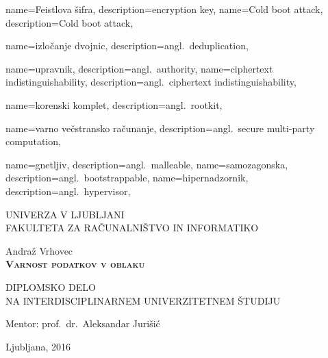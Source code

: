 \documentclass[12pt,a4paper,openany,tikz]{book}
\theoremstyle{plain}
\theoremstyle{definition}
\begin{document}
{
  name=Feistlova šifra,
  description={encryption key},
}
{
  name=Cold boot attack,
  description={Cold boot attack},
}

{
  name=izločanje dvojnic,
  description={angl.\ deduplication},
}

{
  name=upravnik,
  description={angl.\ authority},
}
{
  name=ciphertext indistinguishability,
  description={angl.\ ciphertext indistinguishability},
}

{
  name=korenski komplet,
  description={angl.\ rootkit},
}

{
  name=varno večstransko računanje,
  description={angl.\ secure multi-party computation},
}

{
  name=gnetljiv,
  description={angl.\ malleable},
}
{
  name=samozagonska,
  description={angl.\ bootstrappable},
}
{
  name=hipernadzornik,
  description={angl.\ hypervisor},
}



\thispagestyle{empty}

\begin{center}
{\large
UNIVERZA V LJUBLJANI\\
FAKULTETA ZA RAČUNALNIŠTVO IN INFORMATIKO\\
}

\vspace{3cm}
{\LARGE Andraž Vrhovec}\\

\vspace{2cm}
\textsc{\textbf{\LARGE
Varnost podatkov v oblaku
}}

\vspace{2cm}
{ DIPLOMSKO DELO}\\
{ NA INTERDISCIPLINARNEM UNIVERZITETNEM ŠTUDIJU
}


\vspace{2cm}
{\Large Mentor: prof.\ dr.\ Aleksandar Jurišić}

\vfill
{\Large Ljubljana, 2016}
\end{center}

\newpage

\ \thispagestyle{empty}

\newpage
\end{document}
